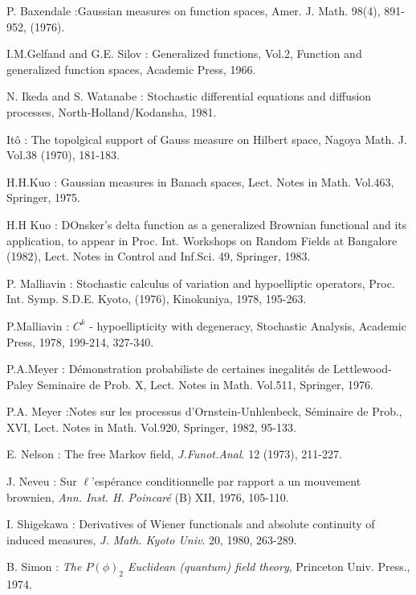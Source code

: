 \begin{thebibliography}{99}
 {P. Baxendale} :\pageoriginale Gaussian measures on
  function spaces,  Amer. J. Math. 98(4), 891-952, (1976). 

 {I.M.Gelfand and G.E. Silov} : Generalized functions, Vol.2,
  Function and generalized function spaces, Academic Press, 1966. 

 {N. Ikeda and S. Watanabe} : Stochastic differential
  equations and diffusion processes, North-Holland/Kodansha, 1981. 

 {It\^{o}} : The topolgical support of Gauss measure on
  Hilbert space, Nagoya Math. J. Vol.38 (1970), 181-183. 

 {H.H.Kuo} : Gaussian measures in Banach spaces,
  Lect. Notes in Math. Vol.463, Springer, 1975. 

 {H.H Kuo} : DOnsker's delta function as a generalized
  Brownian functional and its application, to appear in
  Proc. Int. Workshops on Random Fields at Bangalore (1982),
  Lect. Notes in Control and Inf.Sci. 49, Springer, 1983. 

 {P. Malliavin} : Stochastic calculus of variation and
  hypoelliptic operators, Proc. Int. Symp. S.D.E. Kyoto, (1976),
  Kinokuniya, 1978, 195-263. 

 {P.Malliavin} : $C^k$ - hypoellipticity with degeneracy,
  Stochastic Analysis, Academic Press, 1978, 199-214, 327-340. 

 {P.A.Meyer} : D\'emonstration probabiliste de certaines
  inegalit\'es de Lettlewood-Paley Seminaire de Prob. X, Lect. Notes in
  Math. Vol.511, Springer, 1976. 

 {P.A. Meyer} :\pageoriginale Notes sur les processus
  d'Ornstein-Unhlenbeck, S\'eminaire de Prob., XVI, Lect. Notes in
  Math. Vol.920, Springer, 1982, 95-133. 

 {E. Nelson :} The free Markov field,
  \textit{J.Funot.Anal}. 12 (1973), 211-227. 

 {J. Neveu :} Sur $\ell$'esp\'erance conditionnelle par
  rapport a un mouvement brownien, \textit{Ann. Inst. H. Poincar\'e}
  (B) XII, 1976, 105-110.  

 {I. Shigekawa :} Derivatives of Wiener functionals and
  absolute continuity of induced measures, \textit{J. Math. Kyoto
    Univ}. 20, 1980, 263-289. 

 {B. Simon : } \textit{The $P(\phi)_2$ Euclidean (quantum)
  field theory}, Princeton Univ. Press., 1974. 


\end{thebibliography}
